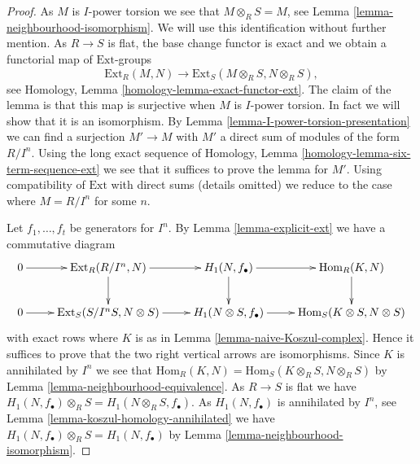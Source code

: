 \begin{proof}
As $M$ is $I$-power torsion we see that $M \otimes_R S = M$, see
Lemma \ref{lemma-neighbourhood-isomorphism}.
We will use this identification without further mention.
As $R \to S$ is flat, the base change functor is exact and we
obtain a functorial map of $\text{Ext}$-groups
$$
\text{Ext}_R(M, N)
\longrightarrow
\text{Ext}_S(M \otimes_R S, N \otimes_R S),
$$
see
Homology, Lemma \ref{homology-lemma-exact-functor-ext}.
The claim of the lemma is that this map is surjective when
$M$ is $I$-power torsion. In fact we will show that it is an
isomorphism. By
Lemma \ref{lemma-I-power-torsion-presentation}
we can find a surjection $M' \to M$ with $M'$ a direct sum of
modules of the form $R/I^n$. Using the long exact sequence of
Homology, Lemma \ref{homology-lemma-six-term-sequence-ext}
we see that it suffices to prove the lemma for $M'$.
Using compatibility of $\text{Ext}$ with direct sums (details omitted)
we reduce to the case where $M = R/I^n$ for some $n$.

\medskip\noindent
Let $f_1, \ldots, f_t$ be generators for $I^n$. By
Lemma \ref{lemma-explicit-ext}
we have a commutative diagram
$$
\xymatrix{
0 \ar[r] &
\text{Ext}_R(R/I^n, N) \ar[r] \ar[d] &
H_1(N, f_\bullet) \ar[r] \ar[d] &
\text{Hom}_R(K, N) \ar[d] \\
0 \ar[r] &
\text{Ext}_S(S/I^nS, N \otimes S) \ar[r] &
H_1(N \otimes S, f_\bullet) \ar[r] &
\text{Hom}_S(K \otimes S, N \otimes S)
}
$$
with exact rows where $K$ is as in
Lemma \ref{lemma-naive-Koszul-complex}.
Hence it suffices to prove that the two right vertical arrows are
isomorphisms. Since $K$ is annihilated by $I^n$ we see that
$\text{Hom}_R(K, N) = \text{Hom}_S(K \otimes_R S, N \otimes_R S)$ by
Lemma \ref{lemma-neighbourhood-equivalence}.
As $R \to S$ is flat we have
$H_1(N, f_\bullet) \otimes_R S = H_1(N \otimes_R S, f_\bullet)$.
As $H_1(N, f_\bullet)$ is annihilated by $I^n$, see
Lemma \ref{lemma-koszul-homology-annihilated}
we have $H_1(N, f_\bullet) \otimes_R S = H_1(N, f_\bullet)$ by
Lemma \ref{lemma-neighbourhood-isomorphism}.
\end{proof}

